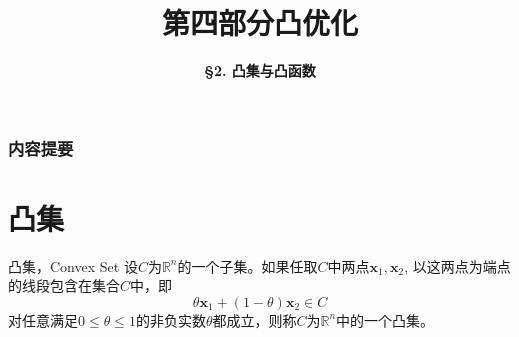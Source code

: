 



\title[Convex Optimization]{\LARGE \bfseries 第四部分\quad 凸优化} %
\author[Convex Sets and Convex Functions] %
{\Large \bfseries \S 2. 凸集与凸函数}
\date{}






\begin{frame}

\titlepage %

\end{frame}


\begin{frame}
\frametitle{内容提要} %
\tableofcontents %
\end{frame}


\section{凸集}


\begin{frame}

\begin{block}{凸集，Convex Set}
设$C$为$\mathbb{R}^n$的一个子集。如果任取$C$中两点$\mathbf{x}_1, \mathbf{x}_2$, 以这两点为端点的线段包含在集合$C$中，即
\[\theta \mathbf{x}_1 + (1-\theta)\mathbf{x}_2 \in C\]
对任意满足$0\le \theta \le 1$的非负实数$\theta$都成立，则称$C$为$\mathbb{R}^n$中的一个凸集。
\end{block}

\end{frame}

